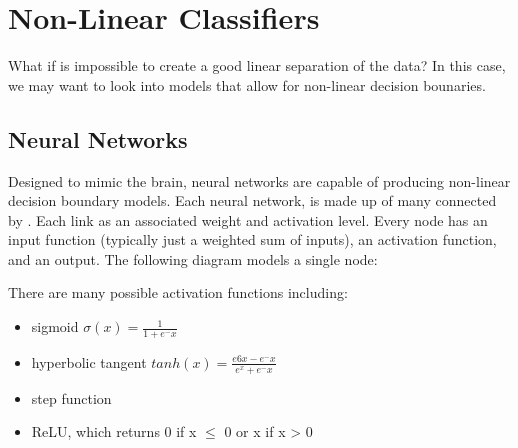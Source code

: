 \chapter{Non-Linear Classifiers}
What if is impossible to create a good linear separation of the data? In this case, we may want to look into models that allow for non-linear decision bounaries.

\begin{center}
\end{center}

\section{Neural Networks}
Designed to mimic the brain, neural networks are capable of producing non-linear decision boundary models. Each neural network, is made up of many  connected by . Each link as an associated weight and activation level. Every node has an input function (typically just a weighted sum of inputs), an activation function, and an output. The following diagram models a single node:

\begin{center}
\end{center}

There are many possible activation functions including:
\begin{itemize}
    \item sigmoid $\sigma(x) = \frac{1}{1 + e^-x}$
    \item hyperbolic tangent $tanh(x) = \frac{e6x-e^-x}{e^x+e^-x}$
    \item step function
    \item ReLU, which returns 0 if x $\leq$ 0 or x if x > 0
\end{itemize}